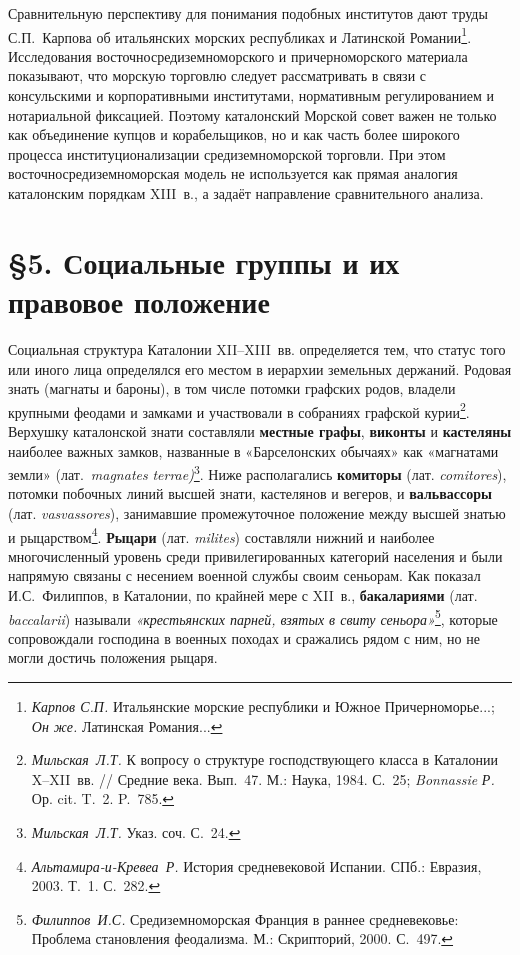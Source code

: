 Сравнительную перспективу для понимания подобных институтов дают труды С.П.~Карпова об итальянских морских республиках и Латинской Романии\footnote{\emph{Карпов С.П.} Итальянские морские республики и Южное Причерноморье...; \emph{Он же.} Латинская Романия...}. Исследования восточносредиземноморского и причерноморского материала показывают, что морскую торговлю следует рассматривать в связи с консульскими и корпоративными институтами, нормативным регулированием и нотариальной фиксацией. Поэтому каталонский Морской совет важен не только как объединение купцов и корабельщиков, но и как часть более широкого процесса институционализации средиземноморской торговли. При этом восточносредиземноморская модель не используется как прямая аналогия каталонским порядкам XIII~в., а задаёт направление сравнительного анализа.

\section*{§5. Социальные группы и их правовое положение}

Социальная структура Каталонии XII--XIII~вв. определяется тем, что статус того или иного лица определялся его местом в иерархии земельных держаний. Родовая знать (магнаты и бароны), в том числе потомки графских родов, владели крупными феодами и замками и участвовали в собраниях графской курии\footnote{\emph{Мильская}\emph{~}\emph{Л}\emph{.}\emph{Т}\emph{.} К вопросу о структуре господствующего класса в Каталонии X--XII~вв. // Средние века. Вып.~47. М.: Наука, 1984. С.~25; \emph{Bonnassie }\emph{Р}\emph{. }Ор. cit. T.~2. P.~785.}. Верхушку каталонской знати составляли \textbf{местные графы}, \textbf{виконты} и \textbf{кастеляны} наиболее важных замков, названные в «Барселонских обычаях» как «магнатами земли» (лат.~\emph{magnates}\emph{ }\emph{terrae}\emph{)}\footnote{\emph{Мильская}\emph{~}\emph{Л.Т.} Указ. соч. С.~24.}. Ниже располагались \textbf{комиторы}\textbf{ }(лат. \emph{comitores}),\textbf{ }потомки побочных линий высшей знати, кастелянов и вегеров, и \textbf{вальвассоры}\textbf{ }(лат. \emph{vasvassores}), занимавшие промежуточное положение между высшей знатью и рыцарством\footnote{\emph{Альтамира}\emph{-и-}\emph{Кревеа}\emph{~}\emph{Р.} История средневековой Испании. СПб.: Евразия, 2003. Т.~1. С.~282.}. \textbf{Рыцари} (лат. \emph{milites}) составляли нижний и наиболее многочисленный уровень среди привилегированных категорий населения и были напрямую связаны с несением военной службы своим сеньорам. Как показал И.С.~Филиппов, в Каталонии, по крайней мере с XII~в., \textbf{бакалари}\textbf{ями} (лат. \emph{baccalarii}) называли \emph{«крестьянских парней, взятых в свиту сеньора»}\footnote{\emph{Филиппов~И.С.} Средиземноморская Франция в раннее средневековье: Проблема становления феодализма. М.: Скрипторий, 2000. С.~497.}, которые сопровождали господина в военных походах и сражались рядом с ним, но не могли достичь положения рыцаря.

